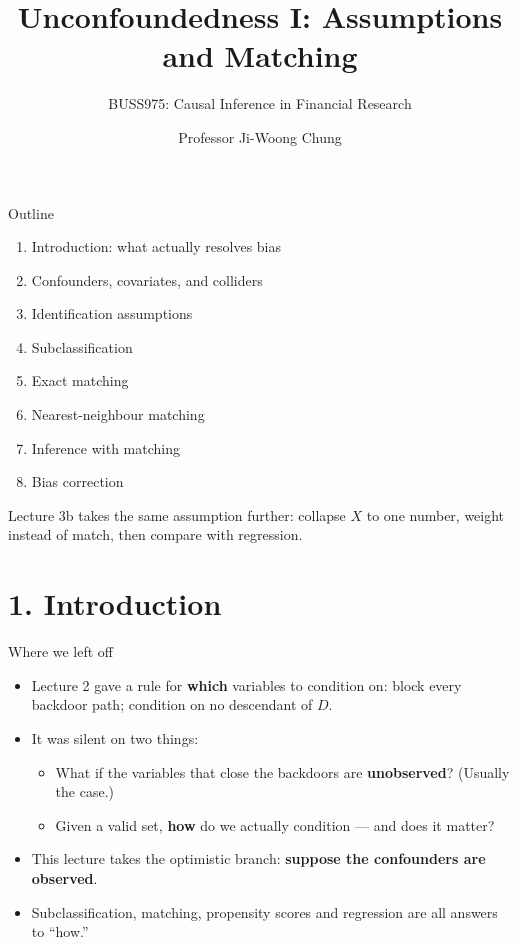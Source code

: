 \documentclass[
  11pt,
  ignorenonframetext,
  aspectratio=169,
]{beamer}
\title{\texorpdfstring{Unconfoundedness I: Assumptions and
Matching}{Unconfoundedness I: Assumptions and Matching}}
\subtitle{\texorpdfstring{BUSS975: Causal Inference in Financial
Research}{BUSS975: Causal Inference in Financial Research}}
\author{Professor Ji-Woong Chung}
\date{}
\institute{Korea University}
\providecommand{\tightlist}{%
  \setlength{\itemsep}{0pt}\setlength{\parskip}{0pt}}
\begin{document}
\frame{\titlepage}


\begin{frame}{Outline}
\protect{}\label{outline}
\begin{enumerate}
\tightlist
\item
  Introduction: what actually resolves bias
\item
  Confounders, covariates, and colliders
\item
  Identification assumptions
\item
  Subclassification
\item
  Exact matching
\item
  Nearest-neighbour matching
\item
  Inference with matching
\item
  Bias correction
\end{enumerate}

\vspace{0.6em}

Lecture 3b takes the same assumption further: collapse \(X\) to one
number, weight instead of match, then compare with regression.
\end{frame}

\section{1. Introduction}\label{introduction}

\begin{frame}{Where we left off}
\protect{}\label{where-we-left-off}
\begin{itemize}
\tightlist
\item
  Lecture 2 gave a rule for \textbf{which} variables to condition on:
  block every backdoor path; condition on no descendant of \(D\).
\item
  It was silent on two things:

  \begin{itemize}
  \tightlist
  \item
    What if the variables that close the backdoors are
    \textbf{unobserved}? (Usually the case.)
  \item
    Given a valid set, \textbf{how} do we actually condition --- and
    does it matter?
  \end{itemize}
\item
  This lecture takes the optimistic branch: \textbf{suppose the
  confounders are observed}.
\item
  Subclassification, matching, propensity scores and regression are all
  answers to ``how.''
\end{itemize}
\end{frame}
\end{document}
